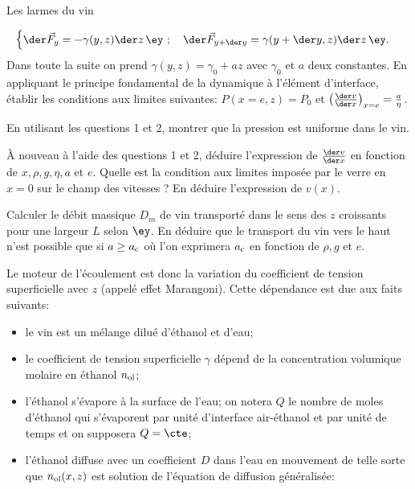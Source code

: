 \begin{exo}[PC]{Les larmes du vin}
\begin{quest}
\begin{equation*}
\begin{cases}
\der\Vec{F}_y=-\gamma(y,z)\der z\,\ey~;\quad \der\Vec{F}_{y+\der y}=\gamma(y+\der y,z)\der z\,\ey.\\
 \end{cases}
 \end{equation*}
 Dans toute la suite on prend $\gamma(y,z)=\gamma_0+a z$ avec $\gamma_0$ et $a$ deux constantes. En appliquant le principe fondamental de la dynamique à l'élément d'interface, établir les conditions aux limites suivantes: $P(x=e,z)=P_0$ et $\left(\frac{\der v}{\der x}\right)_{x=e}=\frac{a}{\eta}$.
 \item En utilisant les questions 1 et 2, montrer que la pression est uniforme dans le vin.
 \item À nouveau à l'aide des questions 1 et 2, déduire l'expression de $\frac{\der v}{\der x}$ en fonction de $x,\rho,g,\eta,a$ et $e$. Quelle est la condition aux limites imposée par le verre en $x=0$ sur le champ des vitesses ? En déduire l'expression de $v(x)$.
 \item Calculer le débit massique $D_m$ de vin transporté dans le sens des $z$ croissants pour une largeur $L$ selon $\ey$. En déduire que le transport du vin vers le haut n'est possible que si $a\geq a_{\rm{c}}$ où l'on exprimera $a_{\rm{c}}$ en fonction de $\rho,g$ et $e$.
 \item Le moteur de l'écoulement est donc la variation du coefficient de tension superficielle avec $z$ (appelé effet Marangoni). Cette dépendance est due aux faits suivants:
 \begin{itemize}
   \item le vin est un mélange dilué d'éthanol et d'eau;
   \item le coefficient de tension superficielle $\gamma$ dépend de la concentration volumique molaire en éthanol $n_{\rm{ol}}$;
   \item l'éthanol s'évapore à la surface de l'eau; on notera $Q$ le nombre de moles d'éthanol qui s'évaporent par unité d'interface air-éthanol et par unité de temps et on supposera $Q=\cte$;
   \item l'éthanol diffuse avec un coefficient $D$ dans l'eau en mouvement de telle sorte que $n_{\rm{ol}}(x,z)$ est solution de l'équation de diffusion généralisée:

\end{itemize}
\end{quest}
\end{exo}
